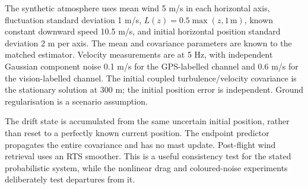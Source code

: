 \documentclass[11pt,a4paper]{article}
\numberwithin{equation}{section}
\begin{document}
The synthetic atmosphere uses mean wind 5 m/s in each horizontal axis, fluctuation standard deviation 1 m/s, $L(z)=0.5\max(z,1\,\mathrm m)$, known constant downward speed 10.5 m/s, and initial horizontal position standard deviation 2 m per axis. The mean and covariance parameters are known to the matched estimator. Velocity measurements are at 5 Hz, with independent Gaussian component noise 0.1 m/s for the GPS-labelled channel and 0.6 m/s for the vision-labelled channel. The initial coupled turbulence/velocity covariance is the stationary solution at 300 m; the initial position error is independent. Ground regularisation is a scenario assumption.

The drift state is accumulated from the same uncertain initial position, rather than reset to a perfectly known current position. The endpoint predictor propagates the entire covariance and has no mast update. Post-flight wind retrieval uses an RTS smoother. This is a useful consistency test for the stated probabilistic system, while the nonlinear drag and coloured-noise experiments deliberately test departures from it.
\end{document}
